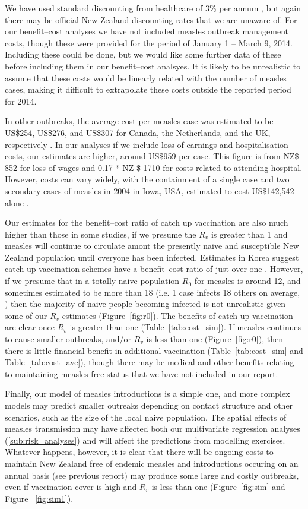 \documentclass{article}
\begin{document}
We have used standard discounting from healthcare of 3\% per annum \citep{honeycutt6}, but again there may be official New Zealand discounting rates that we are unaware of.
For our benefit--cost analyses we have not included measles outbreak management costs, though these were provided for the period of January 1 -- March 9, 2014. Including these could be done, but we would like some further data of these before including them in our benefit--cost analsyes. It is likely to be unrealistic to assume that these costs would be linearly related with the number of measles cases, making it difficult to extrapolate these costs outside the reported period for 2014.

In other outbreaks, the average cost per measles case was estimated to be US\$254, US\$276, and US\$307 for Canada, the Netherlands, and the UK, respectively \citep{carabin2}. In our analyses if we include loss of earnings and hospitalisation costs, our estimates are higher, around US\$959 per case. This figure is from NZ\$ 852 for loss of wages and 0.17 * NZ \$ 1710 for costs related to attending hospital. However, costs can vary widely, with the containment of a single case and two secondary cases of measles in 2004 in Iowa, USA, estimated to cost US\$142,542 alone \citep{dayan5}.

Our estimates for the benefit--cost ratio of catch up vaccination are also much higher than those in some studies, if we presume the $R_v$ is greater than 1 and measles will continue to circulate amont the presently naive and susceptible New Zealand population until overyone has been infected. Estimates in Korea suggest catch up vaccination schemes have a benefit--cost ratio of just over one \citep{bae13}. However, if we presume that in a totally naive population $R_0$ for measles is around 12, and sometimes estimated to be more than 18 (i.e. 1 case infects 18 others on average, \citep{anderson91}) then the majority of naive people becoming infected is not unrealistic given some of our $R_v$ estimates (Figure~\ref{fig:r0}). The benefits of catch up vaccination are clear once $R_v$ is greater than one (Table~\ref{tab:cost_sim}). If measles continues to cause smaller outbreaks, and/or $R_v$ is less than one (Figure~\ref{fig:r0}), then there is little financial benefit in additional vaccination (Table~\ref{tab:cost_sim} and Table~\ref{tab:cost_ave}), though there may be medical and other benefits relating to maintaining measles free status that we have not included in our report.

Finally, our model of measles introductions is a simple one, and more complex models may predict smaller outreaks depending on contact structure and other scenarios, such as the size of the local naive population. The spatial effects of measles transmission may have affected both our multivariate regression analyses (\ref{sub:risk_analyses}) and will affect the predictions from modelling exercises. Whatever happens, however, it is clear that there will be ongoing costs to maintain New Zealand free of endemic measles and introductions occuring on an annual basis (see previous report) may produce some large and costly outbreaks, even if vaccination cover is high and $R_v$ is less than one (Figure~\ref{fig:sim} and Figure ~\ref{fig:sim1}).
\end{document}
